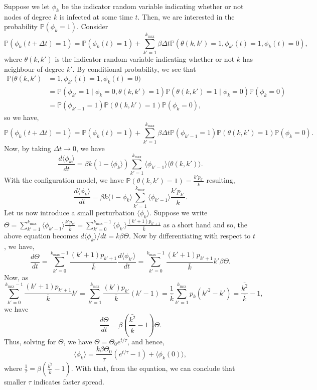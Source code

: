 \documentclass[
]{article}
\theoremstyle{definition}
\theoremstyle{definition}
\begin{document}
Suppose we let \(\phi_k\) be the indicator random variable indicating
whether or not nodes of degree \(k\) is infected at some time \(t\).
Then, we are interested in the probability \(\mathbb{P}(\phi_k = 1)\).
Consider
\[\mathbb{P}(\phi_k(t + \Delta t) = 1) = \mathbb{P}(\phi_k(t) = 1) + 
  \sum_{k' = 1}^{k_{\max}} \beta \Delta t 
  \mathbb{P}(\theta(k, k') = 1, \phi_{k'}(t) = 1, \phi_k(t) = 0),\]
where \(\theta(k, k')\) is the indicator random variable indicating
whether or not \(k\) has neighbour of degree \(k'\). By conditional
probability, we see that \begin{align*}
  \mathbb{P}(\theta(k, k') & = 1, \phi_{k'}(t) = 1, \phi_k(t) = 0) \\
  & = \mathbb{P}(\phi_{k'} = 1 \mid \phi_k = 0, \theta(k, k') = 1)
    \mathbb{P}(\theta(k, k') = 1 \mid \phi_k = 0) \mathbb{P}(\phi_k = 0) \\
  & = \mathbb{P}(\phi_{k' - 1} = 1) \mathbb{P}(\theta(k, k') = 1) 
    \mathbb{P}(\phi_k = 0),
\end{align*} so we have,
\[\mathbb{P}(\phi_k(t + \Delta t) = 1) = \mathbb{P}(\phi_k(t) = 1) + 
  \sum_{k' = 1}^{k_{\max}} \beta \Delta t 
  \mathbb{P}(\phi_{k' - 1} = 1) \mathbb{P}(\theta(k, k') = 1) \mathbb{P}(\phi_k = 0).\]
Now, by taking \(\Delta t \to 0\), we have
\[\frac{d \langle \phi_k \rangle}{dt} = \beta k (1 - \langle \phi_k \rangle) 
  \sum_{k' = 1}^{k_{\max}} \langle \phi_{k' - 1} \rangle \langle \theta(k, k') \rangle.\]
With the configuration model, we have
\(\mathbb{P}(\theta(k, k') = 1) = \frac{k' p_{k'}}{\bar{k}}\) resulting,
\[\frac{d \langle \phi_k \rangle}{dt} = \beta k \langle 1 - \phi_k \rangle
  \sum_{k' = 1}^{k_{\max}} \langle \phi_{k' - 1} \rangle \frac{k' p_{k'}}{\bar{k}}.\]
Let us now introduce a small perturbation \(\langle \phi_k \rangle\).
Suppose we write
\(\Theta = \sum_{k' = 1}^{k_{\max}} \langle \phi_{k' - 1} \rangle \frac{k' p_{k'}}{\bar{k}} = \sum_{k' = 0}^{k_{\max} - 1} \langle \phi_{k'} \rangle \frac{(k' + 1) p_{k' + 1}}{\bar{k}}\)
as a short hand and so, the above equation becomes
\(d\langle \phi_k \rangle / dt = k\beta \Theta\). Now by differentiating
with respect to \(t\), we have,
\[\frac{d\Theta}{dt} = \sum_{k' = 0}^{k_{\max} - 1} \frac{(k' + 1) p_{k' + 1}}{\bar{k}}
\frac{d\langle \phi_{k'} \rangle }{dt} = \sum_{k' = 0}^{k_{\max} - 1} 
\frac{(k' + 1) p_{k' + 1}}{\bar{k}}k'\beta \Theta.\] Now, as
\[\sum_{k' = 0}^{k_{\max} - 1} \frac{(k' + 1) p_{k' + 1}}{\bar{k}}k' = 
  \sum_{k' = 1}^{k_{\max}} \frac{(k') p_{k'}}{\bar{k}}(k' - 1) = \frac{1}{\bar{k}} 
  \sum_{k' = 1}^{k_{\max}}p_k(k'^2- k') = \frac{\bar{k^2}}{\bar{k}} - 1,\]
we have
\[\frac{d\Theta}{dt} = \beta \left(\frac{\bar{k^2}}{\bar{k}} - 1\right) \Theta.\]
Thus, solving for \(\Theta\), we have
\(\Theta = \Theta_0 e^{t / \tau}\), and hence,
\[\langle \phi_k \rangle = \frac{k\beta\Theta_0}{\tau}(e^{t / \tau} - 1) + 
  \langle \phi_k(0) \rangle,\] where
\(\frac{1}{\tau} = \beta(\frac{\bar{k^2}}{\bar{k}} - 1)\). With that,
from the equation, we can conclude that smaller \(\tau\) indicates
faster spread.
\end{document}
